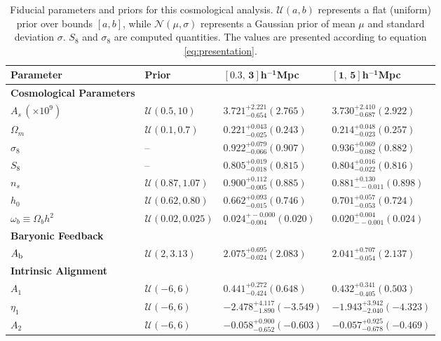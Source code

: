 {\renewcommand{\arraystretch}{1.2}
\begin{table}[ht]
\centering
\caption{\label{tab:post}
Fiducial parameters and priors for this cosmological analysis. 
$\mathcal{U}(a,b)$ represents a flat (uniform) prior over bounds $[a,b]$, while $\mathcal{N}(\mu, \sigma)$ represents a Gaussian prior of mean $\mu$ and standard deviation $\sigma$. $S_8$ and $\sigma_8$ are computed quantities. The values are presented according to equation \ref{eq:presentation}. 
}
\begin{tabular}{l | l | l | l }
\hline
\textbf{Parameter} & \textbf{Prior} & $\mathbf{[0.3,\,3]}$h$\mathbf{^{-1}}$\textbf{Mpc} & $\mathbf{[1,\,5]}$h$\mathbf{^{-1}}$\textbf{Mpc} \\ 
\hline
\hline
\textbf{Cosmological Parameters} &  & & \\
$A_s\,(\times 10^9)$ & $\mathcal{U}(0.5, 10)$ & $3.721_{-0.654}^{+2.221} ({2.765})$ & $3.730_{-0.687}^{+2.410} ({2.922})$ \\ 
$\Omega_m$ & $\mathcal{U}(0.1, 0.7)$ & $0.221_{-0.025}^{+0.043} ({0.243})$ & $0.214_{-0.023}^{+0.048} ({0.257})$ \\ 
$\sigma_8$ & -- & $0.922_{-0.066}^{+0.079} ({0.907})$ & $0.936_{-0.082}^{+0.069} ({0.882})$ \\ 
$S_8$ & -- & $0.805_{-0.018}^{+0.019} ({0.815})$ & $0.804_{-0.022}^{+0.016} ({0.816})$ \\
$n_s$ & $\mathcal{U}(0.87, 1.07)$ & $0.900_{-0.005}^{+0.112} ({0.885})$ & $0.881_{--0.011}^{+0.130} ({0.898})$ \\ 
$h_0$ & $\mathcal{U}(0.62, 0.80)$ & $0.662_{-0.015}^{+0.093} ({0.746})$ & $0.701_{-0.053}^{+0.057} ({0.724})$ \\ 
$\omega_b \equiv \Omega_b h^2$  & $\mathcal{U}(0.02, 0.025)$ & $0.024_{-0.004}^{+-0.000} ({0.020})$ & $0.020_{--0.001}^{+0.004} ({0.024})$ \\ 
\hline
\textbf{Baryonic Feedback} & & & \\
$A_{\rm b}$ & $\mathcal{U}(2, 3.13)$ & $2.075_{-0.024}^{+0.695} ({2.083})$ & $2.041_{-0.054}^{+0.707} ({2.137})$ \\ 
\hline
\textbf{Intrinsic Alignment} & & & \\
$A_1$ & $\mathcal{U}(-6, 6)$ & $0.441_{-0.424}^{+0.272} ({0.648})$ & $0.432_{-0.405}^{+0.341} ({0.503})$ \\ 
$\eta_1$ & $\mathcal{U}(-6, 6)$ & $-2.478_{-1.890}^{+4.117} ({-3.549})$ & $-1.943_{-2.040}^{+3.942} ({-4.323})$ \\ 
$A_2$ & $\mathcal{U}(-6, 6)$ & $-0.058_{-0.652}^{+0.900} ({-0.603})$ & $-0.057_{-0.678}^{+0.925} ({-0.469})$ \\ 

\end{tabular}
\end{table}}
